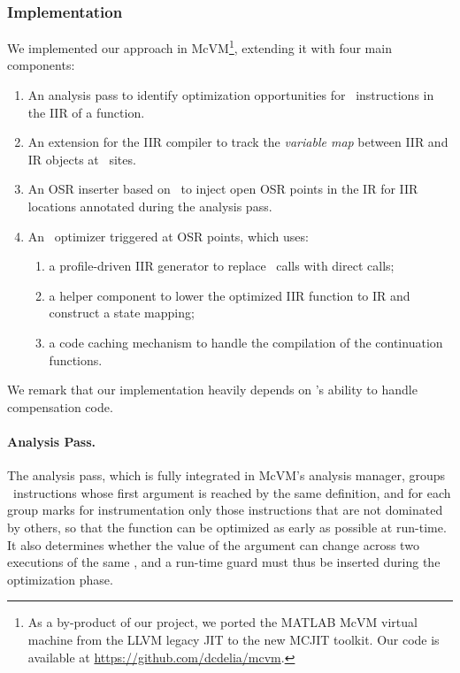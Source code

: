 \subsubsection*{Implementation}

We implemented our approach in McVM\footnote{As a by-product of our project, we ported the MATLAB McVM virtual machine from the LLVM legacy JIT to the new MCJIT toolkit. Our code is available at \url{https://github.com/dcdelia/mcvm}.}, extending it with four main components:

\begin{enumerate}[itemsep=0pt,parsep=3pt]
\item An analysis pass to identify optimization opportunities for \feval\ instructions in the IIR of a function.
\item An extension for the IIR compiler to track the {\em variable map} between IIR and IR objects at \feval\ sites.
\item An OSR inserter based on \osrkit\ to inject open OSR points in the IR for IIR locations annotated during the analysis pass.
\item An \feval\ optimizer triggered at OSR points, which uses:
  \begin{enumerate}[itemsep=0pt,partopsep=0pt]
  \item a profile-driven IIR generator to replace \feval\ calls with direct calls;
  \item a helper component to lower the optimized IIR function to IR and construct a state mapping;
  \item a code caching mechanism to handle the compilation of the continuation functions.
  \end{enumerate}
\end{enumerate}

\noindent We remark that our implementation heavily depends on \osrkit's ability to handle compensation code. 

\paragraph*{Analysis Pass.} The analysis pass, which is fully integrated in McVM's analysis manager, groups \feval\ instructions whose first argument is reached by the same definition, and for each group marks for instrumentation only those instructions that are not dominated by others, so that the function can be optimized as early as possible at run-time.
It also determines whether the value of the argument can change across two executions of the same \feval, and a run-time guard must thus be inserted during the optimization phase.

